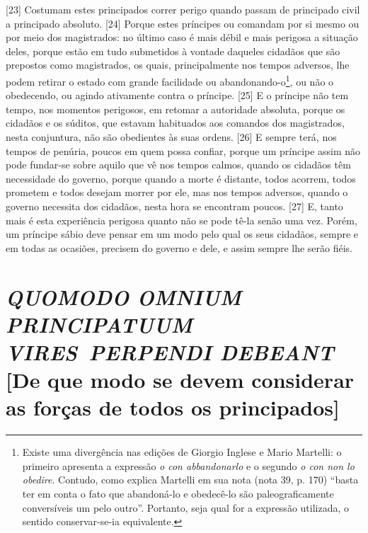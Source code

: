 {[}23{]} Costumam estes principados correr perigo quando passam de
principado civil a principado absoluto. {[}24{]} Porque estes príncipes
ou comandam por si mesmo ou por meio dos magistrados: no último caso é
mais débil e mais perigosa a situação deles, porque estão em tudo
submetidos à vontade daqueles cidadãos que são prepostos como
magistrados, os quais, principalmente nos tempos adversos, lhe podem
retirar o estado com grande facilidade ou abandonando-o\footnote{Existe
  uma divergência nas edições de Giorgio Inglese e Mario Martelli: o
  primeiro apresenta a expressão \emph{o con abbandonarlo} e o segundo
  \emph{o con non lo obedire}. Contudo, como explica Martelli em sua
  nota (nota 39, p. 170) ``basta ter em conta o fato que abandoná-lo e
  obedecê-lo são paleograficamente conversíveis um pelo outro''.
  Portanto, seja qual for a expressão utilizada, o sentido
  conservar-se-ia equivalente.}, ou não o obedecendo, ou agindo
ativamente contra o príncipe. {[}25{]} E o príncipe não tem tempo, nos
momentos perigosos, em retomar a autoridade absoluta, porque os cidadãos
e os súditos, que estavam habituados aos comandos dos magistrados, nesta
conjuntura, não são obedientes às suas ordens. {[}26{]} E sempre terá,
nos tempos de penúria, poucos em quem possa confiar, porque um príncipe
assim não pode fundar-se sobre aquilo que vê nos tempos calmos, quando
os cidadãos têm necessidade do governo, porque quando a morte é
distante, todos acorrem, todos prometem e todos desejam morrer por ele,
mas nos tempos adversos, quando o governo necessita dos cidadãos, nesta
hora se encontram poucos. {[}27{]} E, tanto mais é esta experiência
perigosa quanto não se pode tê-la senão uma vez. Porém, um príncipe
sábio deve pensar em um modo pelo qual os seus cidadãos, sempre e em
todas as ocasiões, precisem do governo e dele, e assim sempre lhe serão
fiéis.

\quebra\section{\emph{QUOMODO OMNIUM PRINCIPATUUM VIRES~PERPENDI DEBEANT}\break
{[}De que modo se devem considerar as forças de todos os principados{]}}

